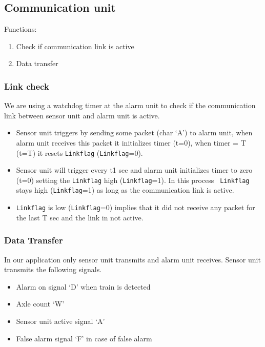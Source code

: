 \documentclass[titlepage]{article}
\begin{document}
\subsection{Communication unit}
Functions:
\begin{enumerate}
  \item Check if communication link is active
  \item Data transfer
\end{enumerate}

\subsubsection{Link check}
We are using a watchdog timer at the alarm unit to check if the communication
link
between sensor unit and alarm unit is active.

\begin{itemize}
\item Sensor unit triggers by sending some packet (char `A') to alarm unit,
when alarm unit
receives this packet it initializes timer (t=0), when timer = T (t=T) it
resets \texttt{Linkflag}
(\texttt{Linkflag}=0).
\item Sensor unit will trigger every t1 sec and alarm unit initializes timer
to zero (t=0) setting
the \texttt{Linkflag} high (\texttt{Linkflag}=1). In this process \texttt{
Linkflag} stays high (\texttt{Linkflag}=1) as long
as the communication link is active.
\item \texttt{Linkflag} is low (\texttt{Linkflag}=0) implies that it did not
receive any packet for the last T sec and the link in not active.
\end{itemize}
\subsubsection{Data Transfer}
In our application only sensor unit transmits and alarm unit receives. Sensor
unit transmits the
following signals.
\begin{itemize}
\item Alarm on signal `D' when train is detected
\item Axle count `W'
\item Sensor unit active signal `A'
\item False alarm signal `F' in case of false alarm
\end{itemize}
\end{document}
